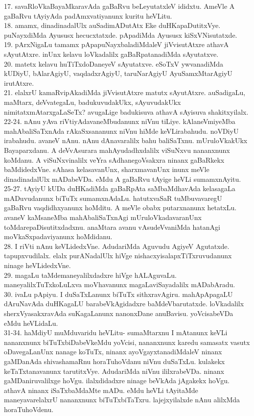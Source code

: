 \documentclass{article}
\begin{document}
17. savaRloVkaBayaMkaravAda gaBaRvu beLeyutatxleV ididxtu. AmeVle A gaBaRvu tAyiyAda padAmxvatiyanunx kuritu heVLitu.\\
18. amamx, dinadinadalUlx auSadimADutAtx Eke duHKapaDutitxVye. puNayxdiMda Ayususx hecucxtatxde. pApadiMda Ayususx kiSxVNisutatxde.\\
19. pArxNigaLu tamamx pApapuNayxbaladiMdaleV jiVvisutAtxre athavA sAyutAtxre. inUnx kelavu loVkadalilx gaBaRpatanadiMda sAyutatxve.\\
20. matetx kelavu huTiTxdoDaneyeV sAyutatxve. eSoTxV ywvanadiMda kUDiyU, bAlarAgiyU, vaqdadxrAgiyU, taruNarAgiyU AyuSamxMtarAgiyU irutAtxre.\\
21. elalxrU kamaRvipAkadiMda jiVvisutAtxre matutx sAyutAtxre. auSadigaLu, maMtarx, deVvategaLu, badukuvudakUkx, sAyuvudakUkx nimitatxmAtarxgaLaSeTx? avugaLige badukisuva athavA sAyisuva shakitxyilalx.\\
22-24. nAnu yAva riVtiyAdavaneMbudanunx niVnu tiLiye. kAlaneVmiyeMba mahAbaliSaTxnAda rAkaSxsananunx niVnu hiMde keVLirabahudu. noVDiyU irabahudu. avaneV nAnu. nAnu dAnavaralilx bahu baliSaTxnu. mUruloVkakUkx Bayaparxdanu. A deVvAsurara mahAyudadhxdalilx viSuNxvu nananxnunx koMdanu. A viSuNxvinalilx veYra sAdhanegoVsakxra ninanx gaBaRkekx baMdidedxVne. sAhasa kelasavanUnx, sharxmavanUnx inunx meVle dinadinadalUlx mADabeVDa. eMdu A gaBaRvu tAyige heVLi sumamxnAyitu.\\
25-27. tAyiyU kUDa duHKadiMda gaBaRpAta saMbaMdhavAda kelasagaLa mADuvudanunx biTuTx sumamxnAdaLu. hatutxvaSaR tuMbuvavaregU gaBaRvu vaqdidhxyanunx hoMditu. A meVle obabx putarxnanunx hetatxLu. avaneV kaMsaneMba mahAbaliSaTxnAgi mUruloVkadavaranUnx toMdarepaDisutitxdadxnu. anaMtara avanu vAsudeVvaniMda hatanAgi moVkaSxpadaviyanunx hoMdidanu.\\
28. I riVti nAnu keVLidedxVne. AdudariMda Aguvudu AgiyeV Agutatxde. tapupxvudilalx. elalx purANadalUlx hiVge nishacxyisalapxTiTxruvudanunx ninage heVLidedxVne.\\
29. magaLu taMdemaneyalilxdadxre hiVge hALAguvaLu. maneyalilxTuTxkoLuLxva moVhavanunx magaLaviSayadalilx mADabAradu.\\
30. ivaLu pApiyu. I duSaTxLanunx biTuTx sithxravAgiru. mahApApagaLU dAruNavAda duHKagaLU barabeVkAgidadxre baMdeVbarutatxde. loVkadalilx sherxVyasakxravAda suKagaLanunx nanonxDane anuBavisu. yoVcisabeVDa eMdu heVLidaLu.\\
31-34. haMdiyU muMduvaridu heVLitu- sumaMtarxnu I mAtanunx keVLi nananxnunx biTuTxbiDabeVkeMdu yoVcisi, nananxnunx karedu samasatx vasutx oDavegaLanUnx nanage koTuTx, ninanx ayoVgayxtanadiMdaleV ninanx gaMDanAda shivashamaRnu horaTuhoVdanu niVnu duSaTxLu. kulakekx keTaTxtanavanunx tarutitxVye. AdudariMda niVnu ililxrabeVDa. ninanx gaMDaniruvalilxge hoVgu. ilalxdidadxre ninage beVkAda jAgakekx hoVgu. athavA ninanx iSaTxbaMdaMte mADu. eMdu heVLi tAyitaMde maneyavarelalxrU nananxnunx biTuTxbiTaTxru. lajejxyilalxde nAnu alilxMda horaTuhoVdenu.\\
\end{document}
